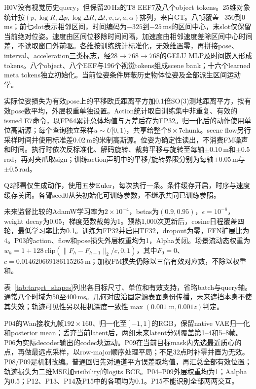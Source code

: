 H0V没有视觉历史query，但保留20\,Hz的T8 EEF7及八个object tokens。25维对象统计按$(p,\log R,\Delta p,\log\Delta R,\Delta t,v,\omega,a,\alpha)$排列，来自GT。八帧覆盖$-350$到0\,ms；前七slot表示相邻区间，时间编码为$-325$到$-25$\,ms的区间中心，末slot仅保留当前绝对位姿。速度由区间位移除时间间隔，加速度由相邻速度差除区间中心时间差，不读取窗口外前驱。各维按训练统计标准化，无效维置零，再拼接pose、interval、acceleration三类标志，经$28\to768\to768$的GELU MLP及时间嵌入形成tokens。八个object、八个EEF与196个视觉tokens组成scene bank；十六个learned meta tokens独立初始化。当前位姿条件屏蔽历史物体位姿及全部派生区间运动学。

实际位姿损失为有效pose上的平移欧氏距离平方加0.1倍SO(3)测地距离平方，按有效pose数平均，外层权重单独设置。Action统计取自训练集中非重复、有效的issued E7命令，以FP64累计总体均值与方差后存为FP32。归一化后的动作使用单位高斯源；每个查询独立采样$u\sim U[0,1)$，共享给整个$8\times7$chunk。scene flow另行采样时间并使用标准差0.02\,m的米制高斯源。位姿为确定性读出，不消费FM噪声和时间。执行时依次反标准化、解码旋转、裁剪平移与旋转至每轴$\pm0.10$\,m和$\pm0.5$\,rad，再对夹爪取sign；训练action声明中的平移/旋转界限分别为每轴$\pm0.05$\,m与$\pm0.5$\,rad。

Q2部署仅生成动作，使用五步Euler，每次执行一条。条件缓存开启，时序与速度缓存关闭。各臂seed0从头初始化可训练参数，不继承共同已训练参照。

未来监督比较的AdamW学习率为$2\times10^{-4}$，betas为$(0.9,0.95)$，$\epsilon=10^{-8}$，weight decay为0.05，梯度范数裁剪为1。预热1,000次更新后，cosine日程覆盖四轮，最低学习率比为0.1。训练为FP32并启用TF32，dropout为零，FFN扩展比为4。P03的action、flow和pose损失外层权重均为1，Alpha关闭。场景流动态权重为$w_h=1+128\,\mathrm{clip}(\|F_h-F_{h-1}\|_2/c,0,1)$，其中$F_0=0$、$c=0.014620669186115265$\,m；加权FM损失仍除以三倍有效对应数，不除以权重和。

表~\ref{tab:target_shapes}列出各目标尺寸、单位和有效支持，省略batch与query轴。通常八个时域为50至400\,ms。几何对应沿固定源表面身份传播，未来遮挡本身不使其失效；轨迹可见性另以相机深度一致性$\max(0.001\text{ m},0.001z)$判定。


P04的Wan接收九帧$192\times160$、归一化至$[-1,1]$的RGB，保留native VAE归一化和posterior mean；丢弃当前latent后，两组未来latent分别覆盖第1--4和5--8帧。P06为实际decoder输出的codec块运动。P09在当前目标mask内先选最近质心的点，再做最远点采样，以row-major顺序处理平局；不足32点时补零并置为无效。P08/P09是机制改编。普通回归先对通道平方误差取均值，再汇总全部有效位置；轨迹损失为二维MSE加visibility的logits BCE。P04--P09外层权重均为1；Aalpha为0.5；P12、P13、P14及P15中的各项均为0.1。P15不能识别全部两两交互。

